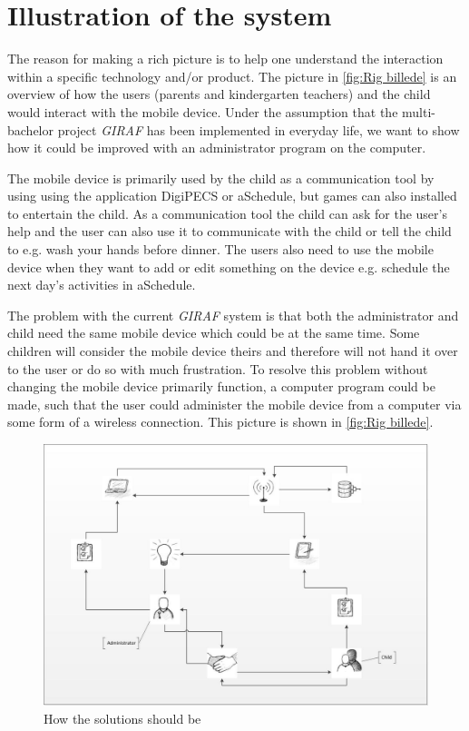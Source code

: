 \section{Illustration of the system}
The reason for making a rich picture is to help one understand the interaction within a specific technology and/or product\cite{OOAD}. The picture in \vref{fig:Rig billede} is an overview of how the users (parents and kindergarten teachers) and the child would interact with the mobile device. Under the assumption that the multi-bachelor project \textit{GIRAF} has been implemented in everyday life, we want to show how it could be improved with an administrator program on the computer.

The mobile device is primarily used by the child as a communication tool by using using the application DigiPECS or aSchedule, but games can also installed to entertain the child. As a communication tool the child can ask for the user's help and the user can also use it to communicate with the child or tell the child to e.g. wash your hands before dinner. 
The users also need to use the mobile device when they want to add or edit something on the device e.g. schedule the next day's activities in aSchedule.  

 
The problem with the current \textit{GIRAF} system is that both the administrator and child need the same mobile device which could be at the same time. Some children will consider the mobile device theirs and therefore will not hand it over to the user or do so with much frustration. To resolve this problem without changing the mobile device primarily function, a computer program could be made, such that the user could administer the mobile device from a computer via some form of a wireless connection. This picture is shown in \vref{fig:Rig billede}. 

\begin{figure}[ht]
	\centering
		\includegraphics[width=1.00\textwidth]{img/Rig_billede.jpg}
	\caption{How the solutions should be}
	\label{fig:Rig billede}
\end{figure}

